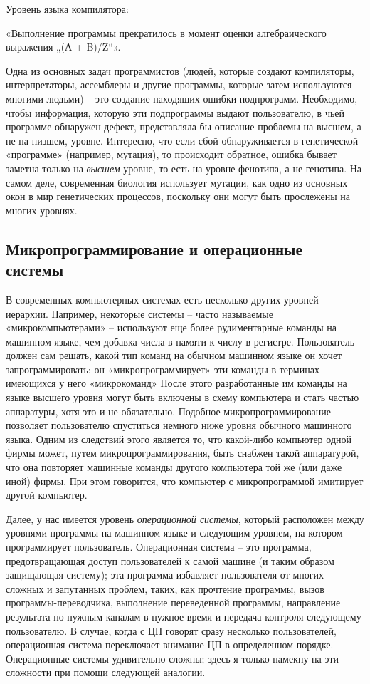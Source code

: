 \documentclass[../main.tex]{subfiles}
\begin{document}
Уровень языка компилятора:

«Выполнение программы прекратилось в момент оценки алгебраического выражения „(А + B)/Z``».

Одна из основных задач программистов (людей, которые создают компиляторы, интерпретаторы, ассемблеры и другие программы, которые затем используются многими людьми) \--- это создание находящих ошибки подпрограмм. Необходимо, чтобы информация, которую эти подпрограммы выдают пользователю, в чьей программе обнаружен дефект, представляла бы описание проблемы на высшем, а не на низшем, уровне. Интересно, что если сбой обнаруживается в генетической «программе» (например, мутация), то происходит обратное, ошибка бывает заметна только на \emph{высшем} уровне, то есть на уровне фенотипа, а не генотипа. На самом деле, современная биология использует мутации, как одно из основных окон в мир генетических процессов, поскольку они могут быть прослежены на многих уровнях.


\subsection{Микропрограммирование и операционные системы}

В современных компьютерных системах есть несколько других уровней иерархии. Например, некоторые системы \--- часто называемые «микрокомпьютерами» \--- используют еще более рудиментарные команды на машинном языке, чем добавка числа в памяти к числу в регистре. Пользователь должен сам решать, какой тип команд на обычном машинном языке он хочет запрограммировать; он «микропрограммирует» эти команды в терминах имеющихся у него «микрокоманд» После этого разработанные им команды на языке высшего уровня могут быть включены в схему компьютера и стать частью аппаратуры, хотя это и не обязательно. Подобное микропрограммирование позволяет пользователю спуститься немного ниже уровня обычного машинного языка. Одним из следствий этого является то, что какой-либо компьютер одной фирмы может, путем микропрограммирования, быть снабжен такой аппаратурой, что она повторяет машинные команды другого компьютера той же (или даже иной) фирмы. При этом говорится, что компьютер с микропрограммой имитирует другой компьютер.

Далее, у нас имеется уровень \emph{операционной системы}, который расположен между уровнями программы на машинном языке и следующим уровнем, на котором программирует пользователь. Операционная система \--- это программа, предотвращающая доступ пользователей к самой машине (и таким образом защищающая систему); эта программа избавляет пользователя от многих сложных и запутанных проблем, таких, как прочтение программы, вызов программы-переводчика, выполнение переведенной программы, направление результата по нужным каналам в нужное время и передача контроля следующему пользователю. В случае, когда с ЦП говорят сразу несколько пользователей, операционная система переключает внимание ЦП в определенном порядке. Операционные системы удивительно сложны; здесь я только намекну на эти сложности при помощи следующей аналогии.
\end{document}
